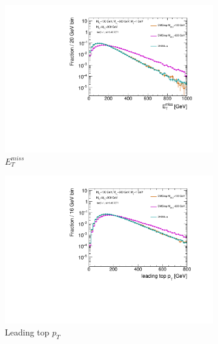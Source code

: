 \begin{figure}
  \centering
  \begin{subfigure}[b]{0.49\textwidth}
    \includegraphics[width=\textwidth]{texinputs/04_grid/figures/DMHF/benchmarking/MDM_1_Ma_100_MA_600_sinp_0.7071_tanb_1.0_VS_DMSimp_100_600_Decayed/metlog.pdf}
    \caption{$E_{T}^{miss}$}
  \end{subfigure}
  \begin{subfigure}[b]{0.49\textwidth}
    \includegraphics[width=\textwidth]{texinputs/04_grid/figures/DMHF/benchmarking/MDM_1_Ma_100_MA_600_sinp_0.7071_tanb_1.0_VS_DMSimp_100_600_Decayed/top1ptlog.pdf}
    \caption{Leading top $p_{T}$}
  \end{subfigure} \\
  \begin{subfigure}[b]{0.49\textwidth}

\end{subfigure}
\end{figure}
